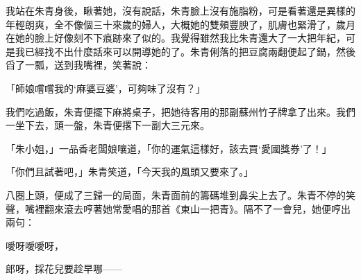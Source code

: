 我站在朱青身後，瞅著她，沒有說話，朱青臉上沒有施脂粉，可是看著還是異樣的年輕朗爽，全不像個三十來歲的婦人，大概她的雙頰豐腴了，肌膚也緊滑了，歲月在她的臉上好像刻不下痕跡來了似的。我覺得雖然我比朱青還大了一大把年紀，可是我已經找不出什麼話來可以開導她的了。朱青俐落的把豆腐兩翻便起了鍋，然後舀了一瓢，送到我嘴裡，笑著說：

「師娘嚐嚐我的‘麻婆豆婆’，可夠味了沒有？」

我們吃過飯，朱青便擺下麻將桌子，把她待客用的那副蘇州竹子牌拿了出來。我們一坐下去，頭一盤，朱青便撂下一副大三元來。

「朱小姐，」一品香老闆娘嚷道，「你的運氣這樣好，該去買‘愛國獎券’了！」

「你們且試著吧，」朱青笑道，「今天我的風頭又要來了。」

八圈上頭，便成了三歸一的局面，朱青面前的籌碼堆到鼻尖上去了。朱青不停的笑聲，嘴裡翻來滾去哼著她常愛唱的那首《東山一把青》。隔不了一會兒，她便哼出兩句：

噯呀噯噯呀，

郎呀，採花兒要趁早哪——



\fussy